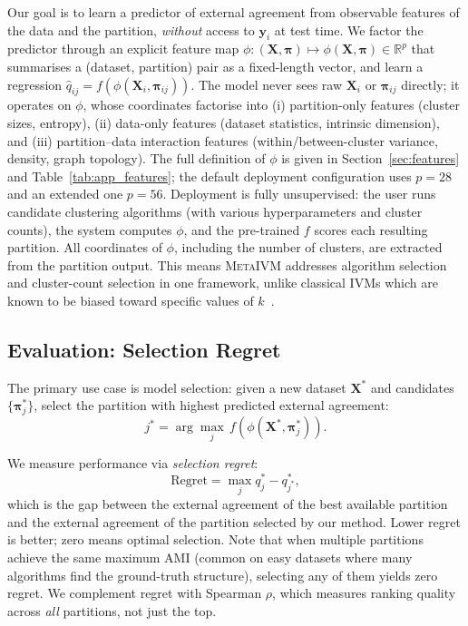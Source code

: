 \documentclass[10pt]{article} %
\newcommand{\ours}{\textsc{MetaIVM}}
\newcommand{\regret}{\text{Regret}}
\begin{document}
Our goal is to learn a predictor of external agreement from observable features of the data and the partition, \emph{without} access to $\mathbf{y}_i$ at test time. We factor the predictor through an explicit feature map $\phi: (\mathbf{X}, \boldsymbol{\pi}) \mapsto \phi(\mathbf{X}, \boldsymbol{\pi}) \in \mathbb{R}^{p}$ that summarises a (dataset, partition) pair as a fixed-length vector, and learn a regression $\hat{q}_{ij} = f(\phi(\mathbf{X}_i, \boldsymbol{\pi}_{ij}))$. The model never sees raw $\mathbf{X}_i$ or $\boldsymbol{\pi}_{ij}$ directly; it operates on $\phi$, whose coordinates factorise into (i) partition-only features (cluster sizes, entropy), (ii) data-only features (dataset statistics, intrinsic dimension), and (iii) partition--data interaction features (within/between-cluster variance, density, graph topology). The full definition of $\phi$ is given in Section~\ref{sec:features} and Table~\ref{tab:app_features}; the default deployment configuration uses $p = 28$ and an extended one $p = 56$. Deployment is fully unsupervised: the user runs candidate clustering algorithms (with various hyperparameters and cluster counts), the system computes $\phi$, and the pre-trained $f$ scores each resulting partition. All coordinates of $\phi$, including the number of clusters, are extracted from the partition output. This means \ours{} addresses algorithm selection and cluster-count selection in one framework, unlike classical IVMs which are known to be biased toward specific values of $k$~\citep{arbelaitz2013extensive}.

\subsection{Evaluation: Selection Regret}

The primary use case is model selection: given a new dataset $\mathbf{X}^*$ and candidates $\{\boldsymbol{\pi}^*_j\}$, select the partition with highest predicted external agreement:
\begin{equation}
    j^* = \arg\max_j\, f\!\left(\phi(\mathbf{X}^*, \boldsymbol{\pi}^*_j)\right).
\end{equation}

We measure performance via \emph{selection regret}:
\begin{equation}
    \regret = \max_j q^*_j - q^*_{j^*},
\end{equation}
which is the gap between the external agreement of the best available partition and the external agreement of the partition selected by our method. Lower regret is better; zero means optimal selection. Note that when multiple partitions achieve the same maximum AMI (common on easy datasets where many algorithms find the ground-truth structure), selecting any of them yields zero regret. We complement regret with Spearman $\rho$, which measures ranking quality across \emph{all} partitions, not just the top.
\end{document}
